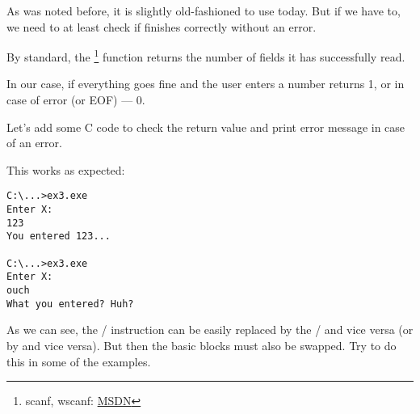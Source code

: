 
As was noted before, it is slightly old-fashioned to use \scanf today. 
But if we have to, we need to at least check if \scanf finishes correctly without an error.



By standard, the \scanf\footnote{scanf, wscanf: \href{http://go.yurichev.com/17255}{MSDN}} function returns the number of fields it has successfully read.

In our case, if everything goes fine and the user enters a number \scanf returns 1, or in case of error (or \ac{EOF}) --- 0.

Let's add some C code to check the \scanf return value and print error message in case of an error.

This works as expected:

\begin{lstlisting}
C:\...>ex3.exe
Enter X:
123
You entered 123...

C:\...>ex3.exe
Enter X:
ouch
What you entered? Huh?
\end{lstlisting}






\subsectionold{\Exercise}

As we can see, the / instruction can be easily replaced by the / and vice versa 
(or  by  and vice versa).
But then the basic blocks must also be swapped.
Try to do this in some of the examples.

